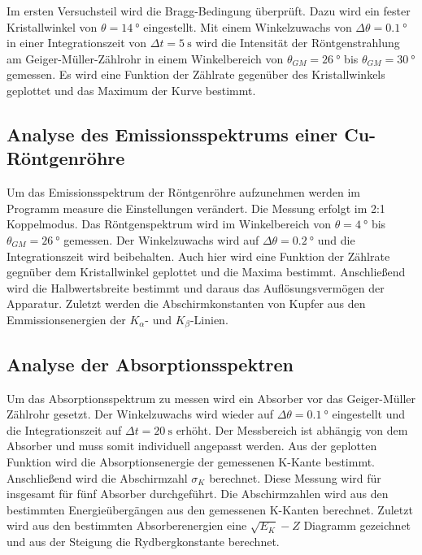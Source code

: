 Im ersten Versuchsteil wird die Bragg-Bedingung überprüft. Dazu wird ein fester Kristallwinkel von $\theta = \qty{14}{\degree}$ eingestellt.
Mit einem Winkelzuwachs von $\Delta\theta = \qty{0.1}{\degree}$ in einer Integrationszeit
von $\Delta t = \qty{5}{\second}$ wird die Intensität der Röntgenstrahlung am Geiger-Müller-Zählrohr in
einem Winkelbereich von $\theta_{GM} = \qty{26}{\degree}$ bis $\theta_{GM} = \qty{30}{\degree}$ gemessen.
Es wird eine Funktion der Zählrate gegenüber des Kristallwinkels geplottet und das Maximum der Kurve bestimmt.

\subsection{Analyse des Emissionsspektrums einer Cu-Röntgenröhre} %
\label{sub:Emission_durch}

Um das Emissionsspektrum der Röntgenröhre aufzunehmen werden im Programm measure die Einstellungen verändert.
Die Messung erfolgt im 2:1 Koppelmodus. Das Röntgenspektrum wird im Winkelbereich von $\theta = \qty{4}{\degree}$ bis $\theta_{GM} = \qty{26}{\degree}$ gemessen. 
Der Winkelzuwachs wird auf $\Delta\theta = \qty{0.2}{\degree}$ und die Integrationszeit wird beibehalten.
Auch hier wird eine Funktion der Zählrate gegnüber dem Kristallwinkel geplottet und die Maxima bestimmt.
Anschließend wird die Halbwertsbreite bestimmt und daraus das Auflösungsvermögen der Apparatur.
Zuletzt werden die Abschirmkonstanten von Kupfer aus den Emmissionsenergien der $K_{\alpha}$- und $K_{\beta}$-Linien.


\subsection{Analyse der Absorptionsspektren} %
\label{sub:Absorption_durch}
Um das Absorptionsspektrum zu messen wird ein Absorber vor das Geiger-Müller Zählrohr gesetzt.
Der Winkelzuwachs wird wieder auf $\Delta\theta = \qty{0.1}{\degree}$ eingestellt und die Integrationszeit
auf $\Delta t = \qty{20}{\second}$ erhöht. Der Messbereich ist abhängig von dem Absorber und muss somit individuell angepasst werden.
Aus der geplotten Funktion wird die Absorptionsenergie der gemessenen K-Kante bestimmt.
Anschließend wird die Abschirmzahl $\sigma_K$ berechnet.
Diese Messung wird für insgesamt für fünf Absorber durchgeführt.
Die Abschirmzahlen wird aus den bestimmten Energieübergängen  aus den gemessenen K-Kanten berechnet.
Zuletzt wird aus den bestimmten Absorberenergien eine $\sqrt{E_K}-Z$ Diagramm gezeichnet und aus der Steigung
die Rydbergkonstante berechnet.

